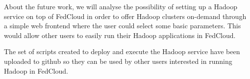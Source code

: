 About the future work, we will analyse the possibility of setting up a Hadoop service on top of FedCloud in order to offer Hadoop clusters on-demand through a simple web frontend where the user could select some basic parameters. This would allow other users to easily run their Hadoop applications in FedCloud.

The set of scripts created to deploy and execute the Hadoop service have been uploaded to github\cite{scripts} so they can be used by other users interested in running Hadoop in FedCloud.


